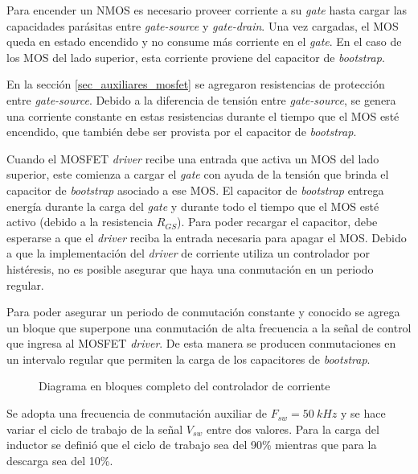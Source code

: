 Para encender un NMOS es necesario proveer corriente a su \textsl{gate} hasta cargar las capacidades parásitas entre \textsl{gate-source} y \textsl{gate-drain}. Una vez cargadas, el MOS queda en estado encendido y no consume más corriente en el \textsl{gate}. En el caso de los MOS del lado superior, esta corriente proviene del capacitor de \textsl{bootstrap}.

En la sección \ref{sec_auxiliares_mosfet} se agregaron resistencias de protección entre \textsl{gate-source}. Debido a la diferencia de tensión entre \textsl{gate-source}, se genera una corriente constante en estas resistencias durante el tiempo que el MOS esté encendido, que también debe ser provista por el capacitor de \textsl{bootstrap}.

\noindent Cuando el MOSFET \textsl{driver} recibe una entrada que activa un MOS del lado superior, este comienza a cargar el \textsl{gate} con ayuda de la tensión que brinda el capacitor de \textsl{bootstrap} asociado a ese MOS. El capacitor de \textsl{bootstrap} entrega energía durante la carga del \textsl{gate} y durante todo el tiempo que el MOS esté activo (debido a la resistencia $R_{GS}$). Para poder recargar el capacitor, debe esperarse a que el \textsl{driver} reciba la entrada necesaria para apagar el MOS. Debido a que la implementación del \textsl{driver} de corriente utiliza un controlador por histéresis, no es posible asegurar que haya una conmutación en un periodo regular.

\noindent Para poder asegurar un periodo de conmutación constante y conocido se agrega un bloque que superpone una conmutación de alta frecuencia a la señal de control que ingresa al MOSFET \textsl{driver}. De esta manera se producen conmutaciones en un intervalo regular que permiten la carga de los capacitores de \textsl{bootstrap}. 

\begin{figure}[H]
	\centering
	\scalebox{0.8}{}
	\caption{Diagrama en bloques completo del controlador de corriente}	\label{fig:img_diag-en-bloques-con-oscilador}
\end{figure}

\noindent Se adopta una frecuencia de conmutación auxiliar de $F_{sw}=50\:kHz$ y se hace variar el ciclo de trabajo de la señal $V_{sw}$ entre dos valores. Para la carga del inductor se definió que el ciclo de trabajo sea del 90\% mientras que para la descarga sea del 10\%.

%



